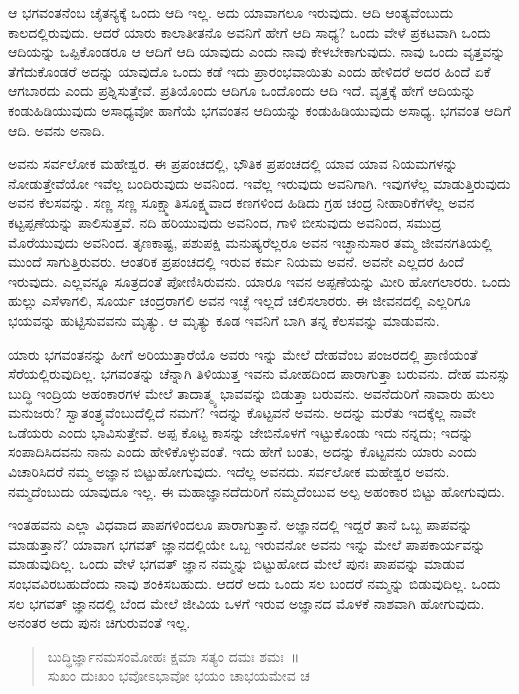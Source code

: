 ಆ ಭಗವಂತನೆಂಬ ಚೈತನ್ಯಕ್ಕೆ ಒಂದು ಆದಿ ಇಲ್ಲ. ಅದು ಯಾವಾಗಲೂ ಇರುವುದು. ಆದಿ ಆಂತ್ಯವೆಂಬುದು ಕಾಲದಲ್ಲಿರುವುದು. ಆದರೆ ಯಾರು ಕಾಲಾತೀತನೊ ಅವನಿಗೆ ಹೇಗೆ ಆದಿ ಸಾಧ್ಯ? ಒಂದು ವೇಳೆ ಪ್ರಕಟವಾಗಿ ಒಂದು ಆದಿಯನ್ನು ಒಪ್ಪಿಕೊಂಡರೂ ಆ ಆದಿಗೆ ಆದಿ ಯಾವುದು ಎಂದು ನಾವು ಕೇಳಬೇಕಾಗುವುದು. ನಾವು ಒಂದು ವೃತ್ತವನ್ನು ತೆಗೆದುಕೊಂಡರೆ ಅದನ್ನು ಯಾವುದೊ ಒಂದು ಕಡೆ ಇದು ಪ್ರಾರಂಭವಾಯಿತು ಎಂದು ಹೇಳಿದರೆ ಅದರ ಹಿಂದೆ ಏಕೆ ಆಗಬಾರದು ಎಂದು ಪ್ರಶ್ನಿಸುತ್ತೇವೆ. ಪ್ರತಿಯೊಂದು ಆದಿಗೂ ಒಂದೊಂದು ಆದಿ ಇದೆ. ವೃತ್ತಕ್ಕೆ ಹೇಗೆ ಆದಿಯನ್ನು ಕಂಡುಹಿಡಿಯುವುದು ಅಸಾಧ್ಯವೋ ಹಾಗೆಯೆ ಭಗವಂತನ ಆದಿಯನ್ನು ಕಂಡುಹಿಡಿಯುವುದು ಅಸಾಧ್ಯ. ಭಗವಂತ ಆದಿಗೆ ಆದಿ. ಅವನು ಅನಾದಿ.

ಅವನು ಸರ್ವಲೋಕ ಮಹೇಶ್ವರ. ಈ ಪ್ರಪಂಚದಲ್ಲಿ, ಭೌತಿಕ ಪ್ರಪಂಚದಲ್ಲಿ ಯಾವ ಯಾವ ನಿಯಮಗಳನ್ನು ನೋಡುತ್ತೇವೆಯೋ ಇವೆಲ್ಲ ಬಂದಿರುವುದು ಅವನಿಂದ. ಇವೆಲ್ಲ ಇರುವುದು ಅವನಿಗಾಗಿ. ಇವುಗಳೆಲ್ಲ ಮಾಡುತ್ತಿರುವುದು ಅವನ ಕೆಲಸವನ್ನು. ಸಣ್ಣ ಸಣ್ಣ ಸೂಕ್ಷ್ಮಾತಿಸೂಕ್ಷ್ಮವಾದ ಕಣಗಳಿಂದ ಹಿಡಿದು ಗ್ರಹ ಚಂದ್ರ ನೀಹಾರಿಕೆಗಳೆಲ್ಲ ಅವನ ಕಟ್ಟಪ್ಪಣೆಯನ್ನು ಪಾಲಿಸುತ್ತವೆ. ನದಿ ಹರಿಯುವುದು ಅವನಿಂದ, ಗಾಳಿ ಬೀಸುವುದು ಅವನಿಂದ, ಸಮುದ್ರ ಮೊರೆಯುವುದು ಅವನಿಂದ. ತೃಣಕಾಷ್ಟ, ಪಶುಪಕ್ಷಿ ಮನುಷ್ಯರೆಲ್ಲರೂ ಅವನ ಇಚ್ಛಾನುಸಾರ ತಮ್ಮ ಜೀವನಗತಿಯಲ್ಲಿ ಮುಂದೆ ಸಾಗುತ್ತಿರುವರು. ಆಂತರಿಕ ಪ್ರಪಂಚದಲ್ಲಿ ಇರುವ ಕರ್ಮ ನಿಯಮ ಅವನೆ. ಅವನೇ ಎಲ್ಲದರ ಹಿಂದೆ ಇರುವುದು. ಎಲ್ಲವನ್ನೂ ಸೂತ್ರದಂತೆ ಪೋಣಿಸಿರುವನು. ಯಾರೂ ಇವನ ಅಪ್ಪಣೆಯನ್ನು ಮೀರಿ ಹೋಗಲಾರರು. ಒಂದು ಹುಲ್ಲು ಎಸೆಳಾಗಲಿ, ಸೂರ್ಯ ಚಂದ್ರರಾಗಲಿ ಅವನ ಇಚ್ಛೆ ಇಲ್ಲದೆ ಚಲಿಸಲಾರರು. ಈ ಜೀವನದಲ್ಲಿ ಎಲ್ಲರಿಗೂ ಭಯವನ್ನು ಹುಟ್ಟಿಸುವವನು ಮೃತ್ಯು. ಆ ಮೃತ್ಯು ಕೂಡ ಇವನಿಗೆ ಬಾಗಿ ತನ್ನ ಕೆಲಸವನ್ನು ಮಾಡುವನು.

ಯಾರು ಭಗವಂತನನ್ನು ಹೀಗೆ ಅರಿಯುತ್ತಾರೆಯೊ ಅವರು ಇನ್ನು ಮೇಲೆ ದೇಹವೆಂಬ ಪಂಜರದಲ್ಲಿ ಪ್ರಾಣಿಯಂತೆ ಸೆರೆಯಲ್ಲಿರುವುದಿಲ್ಲ. ಭಗವಂತನ್ನು ಚೆನ್ನಾಗಿ ತಿಳಿಯುತ್ತ ಇವನು ಮೋಹದಿಂದ ಪಾರಾಗುತ್ತಾ ಬರುವನು. ದೇಹ ಮನಸ್ಸು ಬುದ್ಧಿ ಇಂದ್ರಿಯ ಅಹಂಕಾರಗಳ ಮೇಲೆ ತಾದಾತ್ಮ್ಯ ಭಾವವನ್ನು ಬಿಡುತ್ತಾ ಬರುವನು. ಅವನೆದುರಿಗೆ ನಾವಾರು ಹುಲು ಮನುಜರು? ಸ್ವಾತಂತ್ರ್ಯವೆಂಬುದೆಲ್ಲಿದೆ ನಮಗೆ? ಇದನ್ನು ಕೊಟ್ಟವನೆ ಅವನು. ಅದನ್ನು ಮರೆತು ಇದಕ್ಕೆಲ್ಲ ನಾವೇ ಒಡೆಯರು ಎಂದು ಭಾವಿಸುತ್ತೇವೆ. ಅಪ್ಪ ಕೊಟ್ಟ ಕಾಸನ್ನು ಜೇಬಿನೊಳಗೆ ಇಟ್ಟುಕೊಂಡು ಇದು ನನ್ನದು; ಇದನ್ನು ಸಂಪಾದಿಸಿದವನು ನಾನು ಎಂದು ಹೇಳಿಕೊಳ್ಳುವಂತೆ. ಇದು ಹೇಗೆ ಬಂತು, ಅದನ್ನು ಕೊಟ್ಟವನು ಯಾರು ಎಂದು ವಿಚಾರಿಸಿದರೆ ನಮ್ಮ ಅಜ್ಞಾನ ಬಿಟ್ಟುಹೋಗುವುದು. ಇದೆಲ್ಲ ಅವನದು. ಸರ್ವಲೋಕ ಮಹೇಶ್ವರ ಅವನು. ನಮ್ಮದೆಂಬುದು ಯಾವುದೂ ಇಲ್ಲ. ಈ ಮಹಾಜ್ಞಾನದೆದುರಿಗೆ ನಮ್ಮದೆಂಬುವ ಅಲ್ಪ ಅಹಂಕಾರ ಬಿಟ್ಟು ಹೋಗುವುದು.

ಇಂತಹವನು ಎಲ್ಲಾ ವಿಧವಾದ ಪಾಪಗಳಿಂದಲೂ ಪಾರಾಗುತ್ತಾನೆ. ಅಜ್ಞಾನದಲ್ಲಿ ಇದ್ದರೆ ತಾನೆ ಒಬ್ಬ ಪಾಪವನ್ನು ಮಾಡುತ್ತಾನೆ? ಯಾವಾಗ ಭಗವತ್ ಜ್ಞಾನದಲ್ಲಿಯೇ ಒಬ್ಬ ಇರುವನೋ ಅವನು ಇನ್ನು ಮೇಲೆ ಪಾಪಕಾರ್ಯವನ್ನು ಮಾಡುವುದಿಲ್ಲ. ಒಂದು ವೇಳೆ ಭಗವತ್ ಜ್ಞಾನ ನಮ್ಮನ್ನು ಬಿಟ್ಟುಹೋದ ಮೇಲೆ ಪುನಃ ಪಾಪವನ್ನು ಮಾಡುವ ಸಂಭವವಿರಬಹುದೆಂದು ನಾವು ಶಂಕಿಸಬಹುದು. ಆದರೆ ಅದು ಒಂದು ಸಲ ಬಂದರೆ ನಮ್ಮನ್ನು ಬಿಡುವುದಿಲ್ಲ. ಒಂದು ಸಲ ಭಗವತ್ ಜ್ಞಾನದಲ್ಲಿ ಬೆಂದ ಮೇಲೆ ಜೀವಿಯ ಒಳಗೆ ಇರುವ ಅಜ್ಞಾನದ ಮೊಳಕೆ ನಾಶವಾಗಿ ಹೋಗುವುದು. ಅನಂತರ ಅದು ಪುನಃ ಚಿಗುರುವಂತೆ ಇಲ್ಲ.

\begin{verse}
ಬುದ್ಧಿರ್ಜ್ಞಾನಮಸಂಮೋಹಃ ಕ್ಷಮಾ ಸತ್ಯಂ ದಮಃ ಶಮಃ~॥\\ಸುಖಂ ದುಃಖಂ ಭವೋಽಭಾವೋ ಭಯಂ ಚಾಭಯಮೇವ ಚ 
\end{verse}


